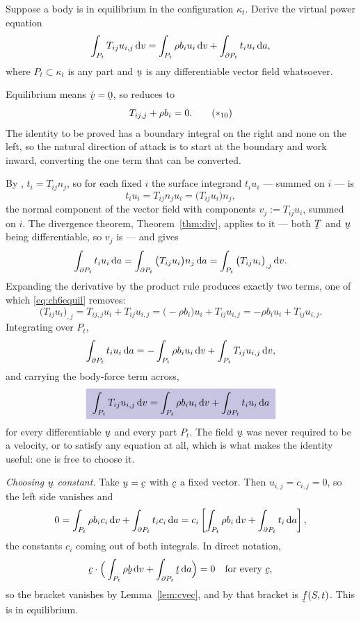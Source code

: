 \begin{problem}
Suppose a body is in equilibrium in the configuration $\kappa_{t}$.
Derive the virtual power equation
\[
   \int_{P_{t}}T_{ij}u_{i,j}\,\mathrm{d} v
   =\int_{P_{t}}\rho b_{i}u_{i}\,\mathrm{d} v
   +\int_{\partial P_{t}}t_{i}u_{i}\,\mathrm{d} a ,
\]
where $P_{t}\subset\kappa_{t}$ is any part and $\bu$ is any
differentiable vector field whatsoever.
\end{problem}

\begin{solution}
Equilibrium means $\dot\bv=\bze$, so  reduces to
\begin{equation}
   T_{ij,j}+\rho b_{i}=0 .
   \tag{$\ast_{10}$}\label{eq:ch6equil}
\end{equation}
The identity to be proved has a boundary integral on the right and none
on the left, so the natural direction of attack is to start at the
boundary and work inward, converting the one term that can be
converted.

By , $t_{i}=T_{ij}n_{j}$, so for each fixed $i$ the surface
integrand $t_{i}u_{i}$ --- summed on $i$ --- is
\[
   t_{i}u_{i}=T_{ij}n_{j}u_{i}=\big(T_{ij}u_{i}\big)n_{j} ,
\]
the normal component of the vector field with components
$v_{j}:=T_{ij}u_{i}$, summed on $i$. The divergence theorem,
Theorem~\ref{thm:div}, applies to it --- both $\bT$ and $\bu$ being
differentiable, so $v_{j}$ is --- and gives
\[
   \int_{\partial P_{t}}t_{i}u_{i}\,\mathrm{d} a
   =\int_{\partial P_{t}}\big(T_{ij}u_{i}\big)n_{j}\,\mathrm{d} a
   =\int_{P_{t}}\big(T_{ij}u_{i}\big)_{,j}\,\mathrm{d} v .
\]
Expanding the derivative by the product rule produces exactly two
terms, one of which \eqref{eq:ch6equil} removes:
\[
   \big(T_{ij}u_{i}\big)_{,j}=T_{ij,j}u_{i}+T_{ij}u_{i,j}
   =\big(-\rho b_{i}\big)u_{i}+T_{ij}u_{i,j}
   =-\rho b_{i}u_{i}+T_{ij}u_{i,j} .
\]
Integrating over $P_{t}$,
\[
   \int_{\partial P_{t}}t_{i}u_{i}\,\mathrm{d} a
   =-\int_{P_{t}}\rho b_{i}u_{i}\,\mathrm{d} v
   +\int_{P_{t}}T_{ij}u_{i,j}\,\mathrm{d} v ,
\]
and carrying the body-force term across,
\[
   \boxed{\;\int_{P_{t}}T_{ij}u_{i,j}\,\dl v
   =\int_{P_{t}}\rho b_{i}u_{i}\,\dl v
   +\int_{\partial P_{t}}t_{i}u_{i}\,\dl a\;}
\]
for every differentiable $\bu$ and every part $P_{t}$. The field $\bu$
was never required to be a velocity, or to satisfy any equation at all,
which is what makes the identity useful: one is free to choose it.

\medskip
\noindent\emph{Choosing $\bu$ constant.}
Take $\bu=\bc$ with $\bc$ a fixed vector. Then $u_{i,j}=c_{i,j}=0$, so
the left side vanishes and
\[
   0=\int_{P_{t}}\rho b_{i}c_{i}\,\mathrm{d} v
   +\int_{\partial P_{t}}t_{i}c_{i}\,\mathrm{d} a
   =c_{i}\left[\int_{P_{t}}\rho b_{i}\,\mathrm{d} v
   +\int_{\partial P_{t}}t_{i}\,\mathrm{d} a\right],
\]
the constants $c_{i}$ coming out of both integrals. In direct notation,
\[
   \ip{\bc}{\Big(\int_{P_{t}}\rho\bb\,\dl v
   +\int_{\partial P_{t}}\bt\,\dl a\Big)}=0
   \quad\text{for every }\bc ,
\]
so the bracket vanishes by Lemma~\ref{lem:cvec}, and by  that
bracket is $\vek{f}(S,t)$. This is  in equilibrium.


\end{solution}
